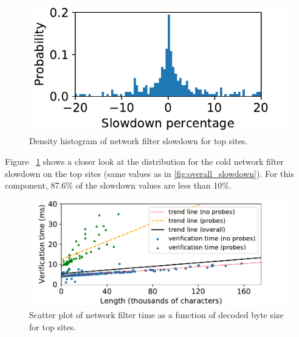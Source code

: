 \begin{figure}[h]
	\includegraphics[scale=0.5]{results/density_histogram_filter_slowdown_small.pdf}
	\caption{Density histogram of network filter slowdown for top sites.}
	\label{fig:histogram_slowdown}
\end{figure}


Figure ~\ref{fig:histogram_slowdown} shows a closer look at the distribution for the cold network filter slowdown on the top sites (same values as in \autoref{fig:overall_slowdown}). For this component, 87.6\% of the slowdown values are less than 10\%.

\begin{figure}[h]
	\includegraphics[scale=0.5]{results/string_length_vs_verification_time_small.pdf}
	\caption{Scatter plot of network filter time as a function of decoded byte size for top sites.}
	\label{fig:verification_time_string_length}
\end{figure}

